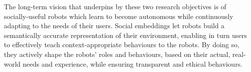 \noindent The long-term vision that underpins by these two research objectives
is of socially-useful robots which learn to become autonomous while
continuously adapting to the needs of their users. Social embeddings let
robots build a semantically accurate representation of their environment,
enabling in turn users to effectively teach context-appropriate behaviours
to the robots. By doing so, they actively shape the robots' roles and
behaviours, based on their actual, real-world needs and experience, while
ensuring transparent and ethical behaviours.

\vspace{0.4em}


%
%
%
%
